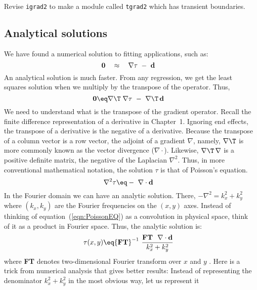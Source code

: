 Revise \texttt{igrad2} to make a module called {\tt tgrad2}
which has transient boundaries.


\subsection{Analytical solutions}
%
We have found a numerical solution to fitting applications, such as:
\begin{equation}
{\bf 0} \quad \approx \quad \nabla \tau \ - \ {\bf d}
\label{eqn:analyticsolution}
\end{equation}
An analytical solution is much faster.
From any regression, we get the least 
squares solution when we multiply by the transpose of the operator. Thus,
\begin{equation}
{\bf 0} \eq \nabla\T\;\nabla \tau \ -\ \nabla\T\,{\bf d}
\end{equation} 
We need to understand what is the transpose of the gradient operator.
Recall the finite difference representation of a derivative in Chapter~1.
Ignoring end effects,
the transpose of a derivative is the negative of a derivative.
Because the transpose of a column vector is a row vector,
the adjoint of a gradient $\nabla$, namely,
$\nabla\T$ is more commonly known as the vector divergence 
($\nabla \cdot$).
Likewise, $\nabla\T\,\nabla$ is a positive definite matrix,
the negative of the Laplacian $\nabla^2$.
Thus, in more conventional mathematical notation,
the solution $\tau$ is that of Poisson's equation. 
\begin{equation}
\nabla^2 \tau \eq - \ \nabla \cdot {\bf d} 
\label{eqn:PoissonEQ}
\end{equation} 
In the Fourier domain we can have an analytic solution.
There, $-\nabla^2 = k_x^2 + k_y^2$ 
where $(k_x , k_y)$ are the Fourier frequencies on the $(x , y )$ axes.
Instead of thinking 
of equation~(\ref{eqn:PoissonEQ}) as a convolution in physical space,
think of it as a product in Fourier space.
Thus, the analytic solution is:
\begin{equation}
\tau(x,y) \eq
{\bf FT}^{-1}\ \frac{ {\bf FT} \ \ \nabla \cdot {\bf d} } { k_x^2+k_y^2}
\end{equation}
where {\bf FT} denotes two-dimensional Fourier transform over $x$ and $y$ . 
Here is a trick from numerical analysis that gives better results: Instead of 
representing the denominator $k_x^2+k_y^2$ in the most obvious way, let us represent it 
